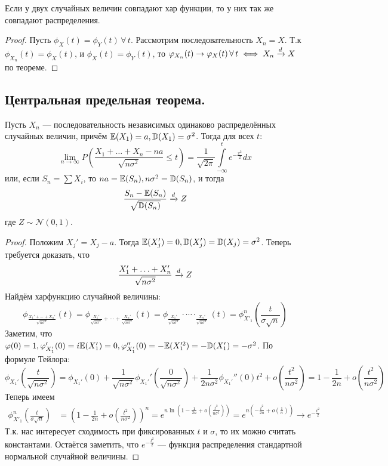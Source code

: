 \begin{corollary}
    Если у двух случайных величин совпадают хар функции, то у них так же совпадают распределения.
\end{corollary}
\begin{proof}
    Пусть $\phi_X(t) = \phi_Y(t) \,\forall\, t$. Рассмотрим последовательность $X_n = X$. Т.к $\phi_{X_n}(t) = \phi_X(t)$,
    и $\phi_X(t) = \phi_Y(t)$, то $\varphi_{X_n}(t) \to \varphi_X(t) \,\forall\, t \iff X_n \xrightarrow{d} X$ по теореме.
\end{proof}

\subsection{Центральная предельная теорема.}
\begin{theorem}
    Пусть $X_n$ --- последовательность независимых одинаково
    распределённых случайных величин, причём $\mathbb{E}(X_1) = a, \mathbb{D}(X_1) = \sigma^2$. Тогда для всех $t$:
    \[
        \lim\limits_{n \to \infty} P\left( \frac{X_1 + \ldots + X_n - na}{\sqrt {n\sigma^2}} \leq t \right)
        = \frac{1}{\sqrt {2\pi}}\int\limits_{-\infty}^{t} e^{-\frac{x^2}{2}}dx
    \]
    или, если $S_n = \sum X_i$, то $na = \mathbb{E}(S_n), n\sigma^2 = \mathbb{D}(S_n)$, и тогда
    \[
        \frac{S_n - \mathbb{E}(S_n)}{\sqrt {\mathbb{D}(S_n)}} \xrightarrow{d} Z
    \]
    где $Z \sim \mathcal{N}(0, 1)$.
\end{theorem}
\begin{proof}
    Положим $X_j' = X_j - a$. Тогда $\mathbb{E}(X_j') = 0, \mathbb{D}(X_j') = \mathbb{D}(X_j) = \sigma^2$. Теперь требуется доказать, что
    \[
        \frac{X_1' + \ldots + X_n'}{\sqrt {n\sigma^2}} \xrightarrow{d} Z
    \]
    Найдём харфункцию случайной величины:
    \[
        \phi_{\frac{X_1' + \ldots + X_n'}{\sqrt {n\sigma^2}}}(t) =
        \phi_{\frac{X_1'}{\sqrt {n\sigma^1}} + \cdots + \frac{X_n'}{\sqrt {n\sigma^1}}}(t) =
        \phi_{\frac{X_1'}{\sqrt {n\sigma^1}}} \cdot \cdots \cdot _{\frac{X_n'}{\sqrt {n\sigma^1}}}(t)=
        \phi^n_{X'_1}\left( \frac{t}{\sigma\sqrt {n}} \right)
    \]
    Заметим, что $\varphi(0) = 1, \varphi'_{X_1'}(0) = i\mathbb{E}(X_1') = 0, \varphi''_{X_1'}(0) = -\mathbb{E}(X_1'^2) = -\mathbb{D}(X_1') = -\sigma^2$.
    По формуле Тейлора:
    \[
        \phi_{X_1'}\left( \frac{t}{\sqrt {n\sigma^2}} \right) = \phi_{X_1'}(0) + \frac{1}{\sqrt {n\sigma^2}}
        \phi_{X_1'}'\left( \frac{0}{\sqrt {n\sigma^2}} \right) + \frac{1}{2n\sigma^2}\phi_{X_1'}''(0)t^2 +
        o\left( \frac{t^2}{n\sigma^2} \right) =
        1 - \frac{1}{2n} + o\left( \frac{t^2}{n\sigma^2} \right)
    \]
    Теперь имеем
    \begin{align*}
        \phi^n_{X'_1}\left( \frac{t}{\sigma\sqrt {n}} \right) &=
        \left( 1 - \frac{1}{2n} + o\left( \frac{t^2}{n\sigma^2} \right) \right)^n =
        e^{n\ln\left( 1 - \frac{1}{2n} + o\left( \frac{t^2}{n\sigma^2} \right) \right)} =
        e^{n\left(- \frac{t^2}{2n} + o\left( \frac{1}{n} \right) \right)} \to e^{-\frac{t^2}{2}}
    \end{align*}
    Т.к. нас интересует сходимость при фиксированных $t$ и $\sigma$, то их можно считать константами.
    Остаётся заметить, что $e^{-\frac{t^2}{2}}$ --- функция распределения стандартной нормальной
    случайной величины.
\end{proof}

